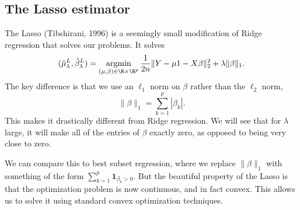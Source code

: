 \documentclass[a4paper]{article}
\DeclareMathOperator*\argmin{argmin}
\begin{document}
\subsection{The Lasso estimator}
The Lasso (Tibshirani, 1996) is a seemingly small modification of Ridge regression that solves our problems. It solves
\[
  (\hat{\mu}_\lambda^L, \hat{\beta}_\lambda^L) = \argmin_{(\mu, \beta) \in \R \times \R^p} \frac{1}{2n} \|Y - \mu 1 - X \beta\|_2^2 + \lambda \|\beta\|_1.
\]
The key difference is that we use an $\ell_1$ norm on $\beta$ rather than the $\ell_2$ norm,
\[
  \|\beta\|_1 = \sum_{k = 1}^p |\beta_k|.
\]
This makes it drastically different from Ridge regression. We will see that for $\lambda$ large, it will make all of the entries of $\beta$ exactly zero, as opposed to being very close to zero.

We can compare this to best subset regression, where we replace $\|\beta\|_1$ with something of the form $\sum_{k = 1}^p \mathbf{1}_{\beta_k > 0}$. But the beautiful property of the Lasso is that the optimization problem is now continuous, and in fact convex. This allows us to solve it using standard convex optimization techniques.
\end{document}
